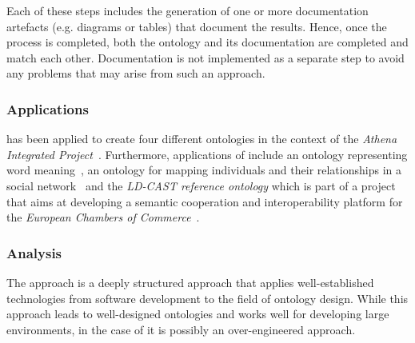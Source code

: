 Each of these steps includes the generation of one or more documentation artefacts (e.g. diagrams or tables) that document the results. Hence, once the  process is completed, both the ontology and its documentation are completed and match each other. Documentation is not implemented as a separate step to avoid any problems that may arise from such an approach.

\subsubsection{Applications}

 has been applied to create four different ontologies in the context of the \emph{Athena Integrated Project}~\cite{AthenaProject}. Furthermore, applications of  include an ontology representing word meaning~\cite{upon_example1}, an ontology for mapping individuals and their relationships in a social network~\cite{upon_example2} and the \emph{LD-CAST reference ontology} which is part of a project that aims at developing a semantic cooperation and interoperability platform for the \emph{European Chambers of Commerce}~\cite{upon_example3,ld_cast}.

\subsubsection{Analysis}

The  approach is a deeply structured approach that applies well-established technologies from software development to the field of ontology design. While this approach leads to well-designed ontologies and works well for developing large environments, in the case of \thinkhome it is possibly an over-engineered approach.

